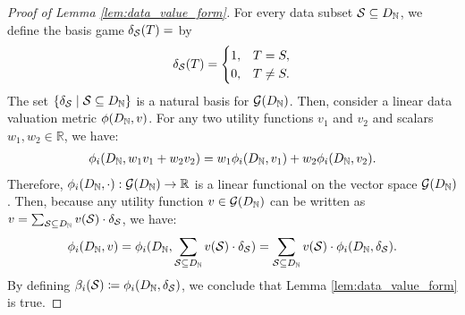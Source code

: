 \begin{proof}[Proof of Lemma \ref{lem:data_value_form}]
	For every data subset $\mathcal{S} \subseteq D_{\mathbb{N}}$, we define the basis game $\delta_{\mathcal{S}}(T) =$ by 
	\begin{align*}
		\delta_{\mathcal{S}}(T) =
		\begin{cases}
			1, & T=S, \\
			0, & T\neq S.
		\end{cases}
	\end{align*}
	The set $\{\delta_{\mathcal{S}} \mid \mathcal{S} \subseteq D_{\mathbb{N}}\}$ is a natural basis for $\mathcal{G}(D_{\mathbb{N}})$.
	Then, consider a linear data valuation metric $\phi(D_{\mathbb{N}}, v)$.
	For any two utility functions $v_1$ and $v_2$ and scalars $w_1, w_2 \in \mathbb{R}$, we have:
	\begin{align*}
		\phi_i(D_{\mathbb{N}}, w_1v_1+w_2v_2) = w_1\phi_i(D_{\mathbb{N}}, v_1) + w_2\phi_i(D_{\mathbb{N}}, v_2).
	\end{align*}
	Therefore, $\phi_i(D_{\mathbb{N}}, \cdot): \mathcal{G}(D_{\mathbb{N}}) \rightarrow \mathbb{R}$ is a linear functional on the vector space $\mathcal{G}(D_{\mathbb{N}})$.
	Then, because any utility function $v\in \mathcal{G}(D_{\mathbb{N}})$ can be written as $v=\sum_{\mathcal{S} \subseteq D_{\mathbb{N}}} v(\mathcal{S})\cdot \delta_{\mathcal{S}}$, we have:
	\begin{align*}
		\phi_i(D_{\mathbb{N}}, v) = \phi_i(D_{\mathbb{N}}, \sum_{\mathcal{S} \subseteq D_{\mathbb{N}}} v(\mathcal{S})\cdot \delta_{\mathcal{S}}) = \sum_{\mathcal{S} \subseteq D_{\mathbb{N}}} v(\mathcal{S})\cdot \phi_i(D_{\mathbb{N}}, \delta_{\mathcal{S}}).
	\end{align*}
	By defining $\beta_i(\mathcal{S}) \coloneqq \phi_i(D_{\mathbb{N}}, \delta_{\mathcal{S}})$, we conclude that Lemma \ref{lem:data_value_form} is true.
	
\end{proof}


